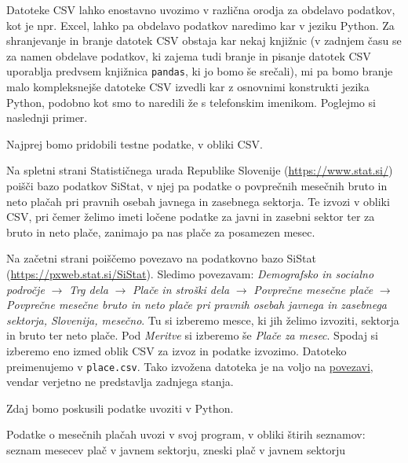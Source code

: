 Datoteke CSV lahko enostavno uvozimo v različna orodja za obdelavo podatkov, kot je npr. Excel, lahko pa obdelavo podatkov naredimo kar v jeziku Python. Za shranjevanje in branje datotek CSV obstaja kar nekaj knjižnic (v zadnjem času se za namen obdelave podatkov, ki zajema tudi branje in pisanje datotek CSV uporablja predvsem knjižnica \texttt{pandas}, ki jo bomo še srečali), mi pa bomo branje malo kompleksnejše datoteke CSV izvedli kar z osnovnimi konstrukti jezika Python, podobno kot smo to naredili že s telefonskim imenikom. Poglejmo si naslednji primer. 

Najprej bomo pridobili testne podatke, v obliki CSV.
\begin{zgled}
Na spletni strani Statističnega urada Republike Slovenije (\url{https://www.stat.si/}) poišči bazo podatkov SiStat, v njej pa podatke o povprečnih mesečnih bruto in neto plačah pri pravnih osebah javnega in zasebnega sektorja. Te izvozi v obliki CSV, pri čemer želimo imeti ločene podatke za javni in zasebni sektor ter za bruto in neto plače, zanimajo pa nas plače za posamezen mesec.
\end{zgled}

\begin{resitev}
Na začetni strani poiščemo povezavo na podatkovno bazo SiStat\\ (\url{https://pxweb.stat.si/SiStat}). Sledimo povezavam: \emph{Demografsko in socialno področje} $\rightarrow$ \emph{Trg dela} $\rightarrow$ \emph{Plače in stroški dela} $\rightarrow$ \emph{Povprečne mesečne plače} $\rightarrow$ \emph{Povprečne mesečne bruto in neto plače pri pravnih osebah javnega in zasebnega sektorja, Slovenija, mesečno}. Tu si izberemo mesce, ki jih želimo izvoziti, sektorja in bruto ter neto plače. Pod \emph{Meritve} si izberemo še \emph{Plače za mesec}. Spodaj si izberemo eno izmed oblik CSV za izvoz in podatke izvozimo. Datoteko preimenujemo v \texttt{place.csv}. Tako izvožena datoteka je na voljo na \href{https://raw.githubusercontent.com/mmoskon/OP_skripta/master/place.csv}{povezavi}, vendar verjetno ne predstavlja zadnjega stanja. 
\end{resitev}

Zdaj bomo poskusili podatke uvoziti v Python.
\begin{zgled}
Podatke o mesečnih plačah uvozi v svoj program, v obliki štirih seznamov: seznam mesecev plač v javnem sektorju, zneski plač v javnem sektorju
\end{zgled}